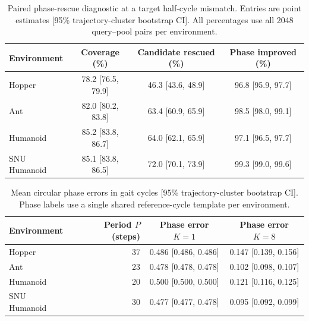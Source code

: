 \begin{table}[H]
\centering\small
\setlength{\tabcolsep}{0.35em}
\begin{tabular}{lccc}
\toprule
Environment & Coverage (\%) & Candidate rescued (\%) & Phase improved (\%) \\
\midrule
Hopper & 78.2 [76.5, 79.9] & 46.3 [43.6, 48.9] & 96.8 [95.9, 97.7] \\
Ant & 82.0 [80.2, 83.8] & 63.4 [60.9, 65.9] & 98.5 [98.0, 99.1] \\
Humanoid & 85.2 [83.8, 86.7] & 64.0 [62.1, 65.9] & 97.1 [96.5, 97.7] \\
SNU Humanoid & 85.1 [83.8, 86.5] & 72.0 [70.1, 73.9] & 99.3 [99.0, 99.6] \\
\bottomrule
\end{tabular}
\caption{Paired phase-rescue diagnostic at a target half-cycle mismatch.
Entries are point estimates [95\% trajectory-cluster bootstrap CI].
All percentages use all 2048 query--pool pairs per environment.}
\label{tab:phase_rescue}
\end{table}
\begin{table}[H]
\centering\small
\begin{tabular}{lrcc}
\toprule
Environment & Period $P$ (steps) & Phase error $K=1$ & Phase error $K=8$ \\
\midrule
Hopper & 37 & 0.486 [0.486, 0.486] & 0.147 [0.139, 0.156] \\
Ant & 23 & 0.478 [0.478, 0.478] & 0.102 [0.098, 0.107] \\
Humanoid & 20 & 0.500 [0.500, 0.500] & 0.121 [0.116, 0.125] \\
SNU Humanoid & 30 & 0.477 [0.477, 0.478] & 0.095 [0.092, 0.099] \\
\bottomrule
\end{tabular}
\caption{Mean circular phase errors in gait cycles [95\% trajectory-cluster
bootstrap CI]. Phase labels use a single shared reference-cycle template
per environment.}
\label{tab:phase_rescue_errors}
\end{table}
